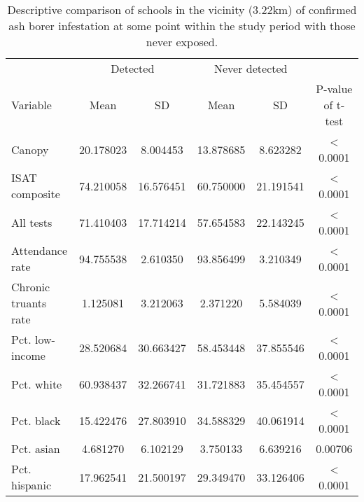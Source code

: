 \begin{table}[!h]

\caption{\label{tab:descriptive-table}Descriptive comparison of schools in the vicinity (3.22km) of confirmed ash borer infestation at some point within the study period with those never exposed.}
\centering
\begin{tabular}[t]{lccccc}
\toprule
\multicolumn{1}{c}{ } & \multicolumn{2}{c}{Detected} & \multicolumn{2}{c}{Never detected} & \multicolumn{1}{c}{ } \\
\cmidrule(l{3pt}r{3pt}){2-3} \cmidrule(l{3pt}r{3pt}){4-5}
Variable & Mean & SD & Mean & SD & P-value of t-test\\
\midrule
Canopy & 20.178023 & 8.004453 & 13.878685 & 8.623282 & < 0.0001\\
ISAT composite & 74.210058 & 16.576451 & 60.750000 & 21.191541 & < 0.0001\\
All tests & 71.410403 & 17.714214 & 57.654583 & 22.143245 & < 0.0001\\
Attendance rate & 94.755538 & 2.610350 & 93.856499 & 3.210349 & < 0.0001\\
Chronic truants rate & 1.125081 & 3.212063 & 2.371220 & 5.584039 & < 0.0001\\
\addlinespace
Pct. low-income & 28.520684 & 30.663427 & 58.453448 & 37.855546 & < 0.0001\\
Pct. white & 60.938437 & 32.266741 & 31.721883 & 35.454557 & < 0.0001\\
Pct. black & 15.422476 & 27.803910 & 34.588329 & 40.061914 & < 0.0001\\
Pct. asian & 4.681270 & 6.102129 & 3.750133 & 6.639216 & 0.00706\\
Pct. hispanic & 17.962541 & 21.500197 & 29.349470 & 33.126406 & < 0.0001\\
\bottomrule
\end{tabular}
\end{table}
